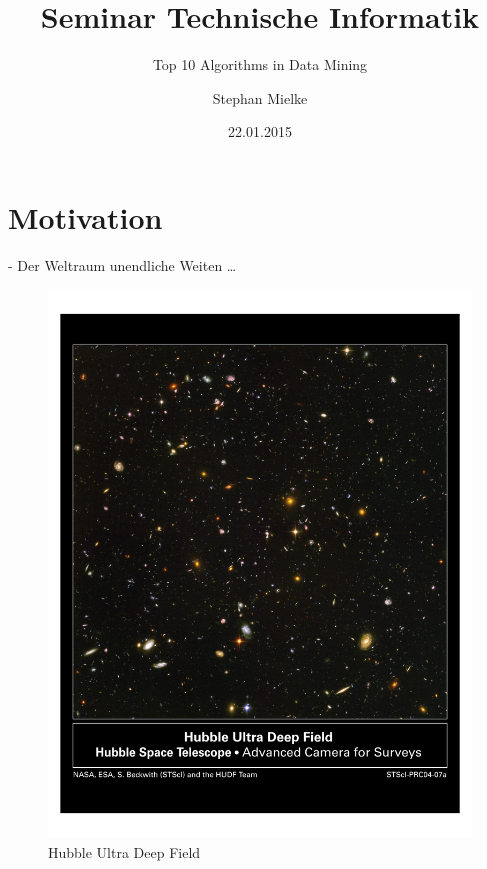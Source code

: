 \documentclass[fleqn,11pt,aspectratio=43]{beamer}
\title{Seminar Technische Informatik}
\subtitle{Top 10 Algorithms in Data Mining}
\author{Stephan Mielke}
\date{22.01.2015}
\begin{document}
\begin{frame}
\titlepage
\end{frame}


\section*{Motivation~}

\begin{frame}[plain]{\insertsectionhead - Der Weltraum unendliche Weiten \dots}

\begin{figure}
\includegraphics[scale=0.6,trim={40 400 40 80},clip]{hs-2004-07-a-pdf}
\caption{Hubble Ultra Deep Field \cite{HUDF}}
\label{fig:hs-2004-07-a-pdf}
\end{figure}
\end{frame}
\end{document}
